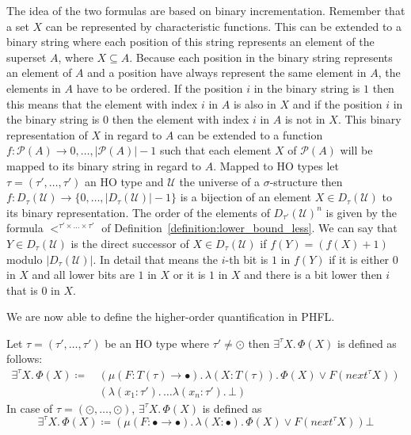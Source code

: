 The idea of the two formulas are based on binary incrementation. Remember that a set $X$ can be represented by
characteristic functions. This can be extended to a binary string where each position of this string represents an
element of the superset $A$, where $X \subseteq A$. Because each position in the binary string represents an element
of $A$ and a position have always represent the same element in $A$, the elements in $A$ have to be ordered. If the
position $i$ in the binary string is $1$ then this means that the element with index $i$ in $A$ is also in $X$ and if
the position $i$ in the binary string is $0$ then the element with index $i$ in $A$ is not in $X$. This binary
representation of $X$ in regard to $A$ can be extended to a function $f\colon \mathcal{P}(A) \rightarrow {0, \dots,
|\mathcal{P}(A)| - 1}$ such that each element $X$ of $\mathcal{P}(A)$ will be mapped to its binary string in regard
to $A$. Mapped to HO types let $\tau = (\tau', \dots, \tau')$ an HO type and $\mathcal{U}$ the universe of a
$\sigma$-structure then $f \colon D_\tau(\mathcal{U}) \rightarrow \{0, \dots, |D_\tau(\mathcal{U})| - 1\}$ is a
bijection of an element $X \in D_\tau(\mathcal{U})$ to its binary representation. The order of the elements of
$D_{\tau'}(\mathcal{U})^n$ is given by the formula $<^{\tau' \times \dots \times \tau'}$ of
Definition~\ref{definition:lower_bound_less}. We can say that $Y \in D_\tau(\mathcal{U})$ is the direct successor of
$X \in D_\tau(\mathcal{U})$ if $f(Y) = (f(X) + 1)$ modulo $|D_\tau(\mathcal{U})|$. In detail that means the
$i$-th bit is $1$ in $f(Y)$ if it is either $0$ in $X$ and all lower bits are $1$ in $X$ or it is $1$ in $X$ and
there is a bit lower then $i$ that is $0$ in $X$.

We are now able to define the higher-order quantification in PHFL.
\begin{definition}
    Let $\tau = (\tau', \dots, \tau')$ be an HO type where $\tau' \neq \odot$ then $\exists^{\tau}X .\,\Phi(X)$ is
    defined as follows:
    \begin{align*}
        \exists^{\tau}X.\, \Phi(X) \coloneqq &\,(\mu (F \colon T(\tau) \rightarrow \bullet).\, \lambda (X \colon T(\tau)
        ).\,
        \Phi(X)
        \vee F(next^\tau X))\\&\,(\lambda (x_1 \colon \tau').\, \dots \lambda (x_n \colon \tau').\,\bot)
    \end{align*}
    In case of $\tau = (\odot, \dots, \odot)$, $\exists^{\tau}X .\,\Phi(X)$ is defined as
    \[        \exists^{\tau}X.\, \Phi(X) \coloneqq (\mu (F \colon \bullet \rightarrow \bullet).\, \lambda (X
    \colon \bullet).\, \Phi(X) \vee F(next^{\tau} X)) \bot
    \]
\end{definition}

